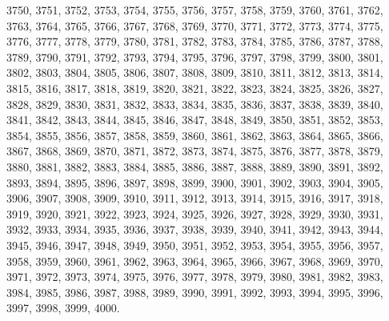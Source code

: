 \documentclass[a4paper,11pt]{article}
\numberwithin{equation}{section}
\begin{document}
3750, 3751, 3752, 3753, 3754, 3755, 3756, 3757, 3758, 3759, 3760, 3761, 3762, 3763, 3764, 3765, 3766, 3767, 3768, 3769, 3770, 3771, 3772, 3773, 3774, 3775, 3776, 3777, 3778, 3779, 3780, 3781, 3782, 3783, 3784, 3785, 3786, 3787, 3788, 3789, 3790, 3791, 3792, 3793, 3794, 3795, 3796, 3797, 3798, 3799, 3800, 3801, 3802, 3803, 3804, 3805, 3806, 3807, 3808, 3809, 3810, 3811, 3812, 3813, 3814, 3815, 3816, 3817, 3818, 3819, 3820, 3821, 3822, 3823, 3824, 3825, 3826, 3827, 3828, 3829, 3830, 3831, 3832, 3833, 3834, 3835, 3836, 3837, 3838, 3839, 3840, 3841, 3842, 3843, 3844, 3845, 3846, 3847, 3848, 3849, 3850, 3851, 3852, 3853, 3854, 3855, 3856, 3857, 3858, 3859, 3860, 3861, 3862, 3863, 3864, 3865, 3866, 3867, 3868, 3869, 3870, 3871, 3872, 3873, 3874, 3875, 3876, 3877, 3878, 3879, 3880, 3881, 3882, 3883, 3884, 3885, 3886, 3887, 3888, 3889, 3890, 3891, 3892, 3893, 3894, 3895, 3896, 3897, 3898, 3899, 3900, 3901, 3902, 3903, 3904, 3905, 3906, 3907, 3908, 3909, 3910, 3911, 3912, 3913, 3914, 3915, 3916, 3917, 3918, 3919, 3920, 3921, 3922, 3923, 3924, 3925, 3926, 3927, 3928, 3929, 3930, 3931, 3932, 3933, 3934, 3935, 3936, 3937, 3938, 3939, 3940, 3941, 3942, 3943, 3944, 3945, 3946, 3947, 3948, 3949, 3950, 3951, 3952, 3953, 3954, 3955, 3956, 3957, 3958, 3959, 3960, 3961, 3962, 3963, 3964, 3965, 3966, 3967, 3968, 3969, 3970, 3971, 3972, 3973, 3974, 3975, 3976, 3977, 3978, 3979, 3980, 3981, 3982, 3983, 3984, 3985, 3986, 3987, 3988, 3989, 3990, 3991, 3992, 3993, 3994, 3995, 3996, 3997, 3998, 3999, 4000.













{}






\end{document}
